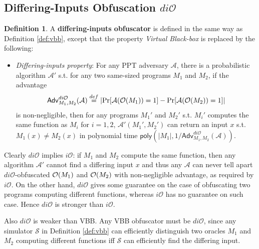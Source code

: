 \documentclass[12pt]{article}
\newcommand{\eqdef}{\stackrel{def}{=}}
\newcommand{\A}{\mathcal{A}}
\newcommand{\Sim}{\mathcal{S}}
\newcommand{\Adv}{\mathsf{Adv}}
\newcommand{\poly}{\mathsf{poly}}
\newcommand{\io}{i\mathcal{O}}
\newcommand{\dio}{di\mathcal{O}}
\theoremstyle{definition}
\newtheorem{definition}[theorem]{Definition}
\begin{document}
\subsection{Differing-Inputs Obfuscation $\dio$}
\begin{definition}
A {\bf differing-inputs obfuscator} is defined in the same way as Definition \ref{def:vbb}, except that the property \emph{Virtual Black-box} is replaced by the following:
\begin{itemize}
\item \emph{Differing-inputs property}: For any PPT adversary $\A$, there is a probabilistic algorithm $\A'$ s.t. for any two same-sized programs $M_1$ and $M_2$, if the advantage
$$\Adv_{M_1,M_2}^{\dio}(\A) \eqdef \left| \Pr[\A(\bigoh(M_1))=1] - \Pr[\A(\bigoh(M_2))=1] \right|$$
is non-negligible, then for any programs $M_1'$ and $M_2'$ s.t. $M_i'$ computes the same function as $M_i$ for $i=1,2$, $\A'(M_1',M_2')$ can return an input $x$ s.t. $M_1(x) \not= M_2(x)$ in polynomial time $\poly(|M_1|, 1/\Adv_{M_1,M_2}^{\dio}(\A))$.
\end{itemize}
\end{definition}

Clearly $\dio$ implies $\io$: if $M_1$ and $M_2$ compute the same function, then any algorithm $\A'$ cannot find a differing input $x$ and thus any $\A$ can never tell apart $\dio$-obfuscated $\mathcal{O}(M_1)$ and $\mathcal{O}(M_2)$ with non-negligible advantage, as required by $\io$.
On the other hand, $\dio$ gives some guarantee on the case of obfuscating two programs computing different functions, whereas $\io$ has no guarantee on such case. Hence $\dio$ is stronger than $\io$.

Also $\dio$ is weaker than VBB. Any VBB obfuscator must be $\dio$, since any simulator $\Sim$ in Definition \ref{def:vbb} can efficiently distinguish two oracles $M_1$ and $M_2$ computing different functions iff $\Sim$ can efficiently find the differing input.
\end{document}
